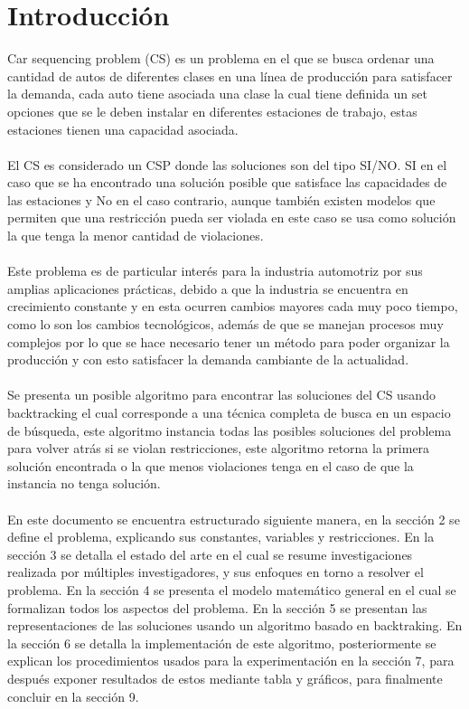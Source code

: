 \documentclass[letter, 10pt]{article}
\begin{document}
\section{Introducci\'on}
Car sequencing problem (CS) es un problema en el que se busca ordenar una cantidad de autos de diferentes clases en una l\'inea de producci\'on para satisfacer la demanda, cada auto tiene asociada una clase la cual tiene definida un set opciones que se le deben instalar en diferentes estaciones de trabajo, estas estaciones tienen una capacidad asociada.\\\\
El CS es considerado un CSP donde las soluciones son del tipo SI/NO. SI en el caso que se ha encontrado una soluci\'on posible que satisface las capacidades de las estaciones y No en el caso contrario, aunque tambi\'en existen modelos que permiten que una restricci\'on pueda ser violada en este caso se usa como soluci\'on la que tenga la menor cantidad de violaciones.
\\\\
Este problema es de particular inter\'es para la industria automotriz por sus amplias aplicaciones pr\'acticas, debido a que la industria se encuentra en crecimiento constante y en esta ocurren cambios mayores cada muy poco tiempo, como lo son los cambios tecnol\'ogicos, adem\'as de que se manejan procesos muy complejos por lo que se hace necesario tener un m\'etodo para poder organizar la producci\'on y con esto satisfacer la demanda cambiante de la actualidad. 
\\\\
Se presenta un posible algoritmo para encontrar las soluciones del CS usando backtracking el cual corresponde a una t\'ecnica completa de busca en un espacio de b\'usqueda, este algoritmo instancia todas las posibles soluciones del problema para volver atr\'as si se violan restricciones, este algoritmo retorna la primera soluci\'on encontrada o la que menos violaciones tenga en el caso de que la instancia no tenga soluci\'on.
\\\\
En este documento se encuentra estructurado siguiente manera, en la secci\'on 2 se define el problema, explicando sus constantes, variables y restricciones. En la secci\'on 3 se detalla el estado del arte en el cual se resume investigaciones realizada por m\'ultiples investigadores, y sus enfoques en torno a resolver el problema. En la secci\'on 4 se presenta el modelo matem\'atico general en el cual se formalizan todos los aspectos del problema. En la secci\'on 5 se presentan las representaciones de las soluciones usando un algoritmo basado en backtraking. En la secci\'on 6 se detalla la implementaci\'on de este algoritmo, posteriormente se explican los procedimientos usados para la experimentaci\'on en la secci\'on 7, para despu\'es exponer resultados de estos mediante tabla y gr\'aficos, para finalmente concluir en la secci\'on 9.
\end{document}
